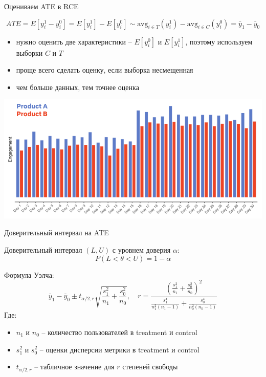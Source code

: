 \documentclass[11pt,aspectratio=169,handout]{beamer}
\begin{document}
\begin{frame}{Оцениваем ATE в RCE}

\[
ATE = E[y_i^1 - y_i^0] = E[y_i^1] - E[y_i^0] \sim \text{avg}_{i \in T}(y_i^1) - \text{avg}_{i \in C}(y_i^0) = \bar y_1 - \bar y_0
\]

\begin{itemize}
\item нужно оценить две характеристики -- $E[y_i^0]$ и $E[y_i^1]$, поэтому используем выборки $C$ и $T$
\item проще всего сделать оценку, если выборка несмещенная
\item чем больше данных, тем точнее оценка
\end{itemize}

\end{frame}

\begin{frame}{}

\begin{center}
\includegraphics[scale=0.3]{images/yesexp.png}
\end{center}

\end{frame}

\begin{frame}{Доверительный интервал на ATE}

Доверительный интервал $(L, U)$ с уровнем доверия $\alpha$:
\[
P(L < \theta < U) = 1 - \alpha
\]

Формула Уэлча:
\[
\bar y_1 - \bar y_0 \pm t_{\alpha/2,r} \sqrt{\frac{s_1^2}{n_1} + \frac{s_0^2}{n_0}}, \quad
r = \frac{ \left( \frac{s_1^2}{n_1} + \frac{s_0^2}{n_0} \right)^2 }{ \frac{s_1^4}{n_1^2 (n_1 - 1)} + \frac{s_0^4}{n_0^2 (n_0 - 1)} }
\]
Где:
\begin{itemize}
\item $n_1$ и $n_0$ -- количество пользователей в treatment и control
\item $s_1^2$ и $s_0^2$ -- оценки дисперсии метрики в treatment и control
\item $t_{\alpha/2,r}$ -- табличное значение для $r$ степеней свободы
\end{itemize}

\end{frame}
\end{document}
